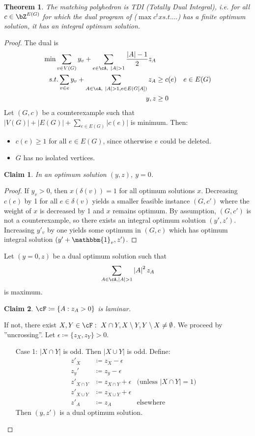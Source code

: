 \documentclass[11pt, a4paper]{article}
\newcommand{\abs}[1]{\left\lvert#1\right\rvert}
\newcommand{\set}[1]{\{#1\}}
\newtheorem{theorem}{Theorem}[section]
\newtheorem*{claim}{Claim}
\theoremstyle{remark}
\theoremstyle{definition}
\begin{document}
\begin{theorem}
	The matching polyhedron is TDI (Totally Dual Integral), i.e. for all
	$c\in \bZ^{E(G)}$ for which the dual program of ($\max c^tx s.t.\ldots$)
	has a finite optimum solution, it has an integral optimum solution.
\end{theorem}
\begin{proof}
	The dual is
	\begin{align*}
		\min \sum_{v\in V(G)}y_v+\sum_{e\in\cA,\ \abs{A}>1}\frac{\abs{A}-1}{2}z_A \\
		s.t.\sum_{v\in e}y_v
		+\sum_{A\in\cA,\ \abs{A}>1,e\in E(G[A])}z_A & \geq c(e) & e\in E(G)       \\
		y,z                                         & \geq0
	\end{align*}
	Let $(G,c)$ be a counterexample such that  $\abs{V(G)}+\abs{E(G)}+
		\sum_{e\in E(G)}\abs{c(e)}$ is minimum. Then:
	\begin{itemize}
		\item $c(e)\geq 1$ for all
		$e\in E(G)$, since otherwise $e$ could be deleted.
		\item $G$ has no isolated vertices.
	\end{itemize}
	\begin{claim}
		In an optimum solution $(y,z)$, $y=0$.
	\end{claim}
	\begin{proof}
		If $y_v>0$, then $x(\delta(v))=1$ for all optimum solutions $x$. Decreasing
		$c(e)$ by 1 for all $e\in\delta(v)$ yields a smaller feasible instance
		$(G,c')$ where the weight of $x$ is decreased by 1 and $x$ remains optimum.
		By assumption, $(G,c')$ is not a counterexample, so there exists an integral
		optimum solution $(y',z')$. Increasing $y'_v$ by one yields some optimum
		in $(G,c)$ which has optimum integral solution $(y'+\mathbbm{1}_v,z')$.
	\end{proof}

	Let $(y=0,z)$ be a dual optimum solution such that
	\[\sum_{A\in\cA, \abs{A}>1} \abs{A}^2z_A\]
	is maximum.
	\begin{claim}
		$\cF\coloneqq\set{A: z_A>0}$ is laminar.
	\end{claim}
	If not, there exist $X,Y\in\cF:\ X\cap Y,X\setminus Y,Y\setminus X\neq\emptyset$.
	We proceed by ''uncrossing''. Let $\epsilon\coloneqq \set{z_X,z_Y}>0$.
	\begin{enumerate}
		\item[Case 1:] $\abs{X\cap Y}$ is odd. Then $\abs{X\cup Y}$ is odd. Define:
		\begin{align*}
			z'_X         & \coloneqq z_X-\epsilon                                             \\
			z_y'         & \coloneqq z_y-\epsilon                                             \\
			z'_{X\cap Y} & \coloneqq z_{X\cap Y}+\epsilon & \text{(unless $\abs{X\cap Y}=1$)} \\
			z'_{X\cup Y} & \coloneqq z_{X\cup Y}+\epsilon                                     \\
			z'_A         & \coloneqq z_A                  & \text{elsewhere}
		\end{align*}
		Then $(y,z')$ is a dual optimum solution.


\end{enumerate}
\end{proof}
\end{document}
